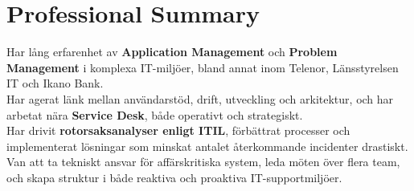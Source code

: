 



\section*{Professional Summary}

Har lång erfarenhet av \textbf{Application Management} och \textbf{Problem Management} i komplexa IT-miljöer, bland annat inom Telenor, Länsstyrelsen IT och Ikano Bank. \\
Har agerat länk mellan användarstöd, drift, utveckling och arkitektur, och har arbetat nära \textbf{Service Desk}, både operativt och strategiskt. \\
Har drivit \textbf{rotorsaksanalyser enligt ITIL}, förbättrat processer och implementerat lösningar som minskat antalet återkommande incidenter drastiskt. \\
Van att ta tekniskt ansvar för affärskritiska system, leda möten över flera team, och skapa struktur i både reaktiva och proaktiva IT-supportmiljöer.
